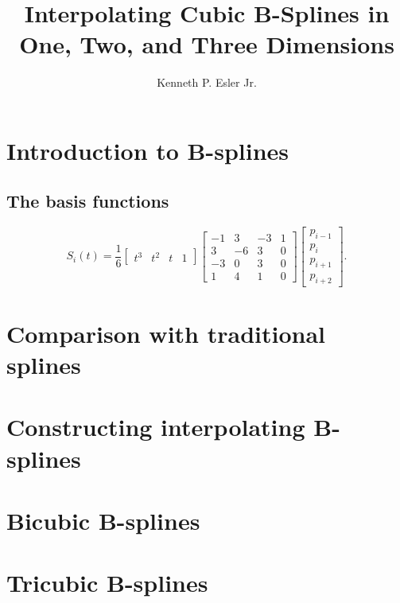 \documentclass{article}
\title{Interpolating Cubic B-Splines in One, Two, and Three Dimensions}
\author{Kenneth P. Esler Jr.}
\begin{document}
\maketitle
\section{Introduction to B-splines}


\subsection{The basis functions}


\begin{equation}
S_i(t) = \frac{1}{6} \left[
\begin{array}{cccc}
t^3 & t^2 & t & 1
\end{array}
\right]
\left[\begin{array}{rrrr}
-1 &  3 & -3 & 1 \\
 3 & -6 &  3 & 0 \\
-3 &  0 &  3 & 0 \\
 1 &  4 &  1 & 0
\end{array}\right]
\left[\begin{array}{l}
p_{i-1} \\ p_i \\ p_{i+1} \\ p_{i+2}
\end{array}\right].
\end{equation}

\section{Comparison with traditional splines}

\section{Constructing interpolating B-splines}

\section{Bicubic B-splines}

\section{Tricubic B-splines}
\end{document}

